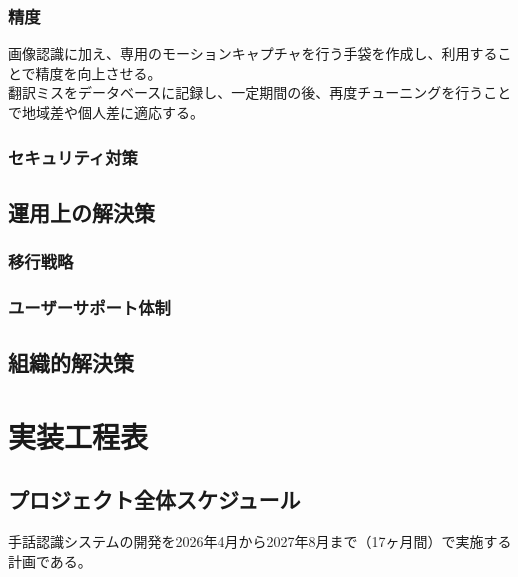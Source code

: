 \documentclass[12pt,a4paper]{jsarticle}
\begin{document}
\subsubsection{精度}
画像認識に加え、専用のモーションキャプチャを行う手袋を作成し、利用することで精度を向上させる。\\
翻訳ミスをデータベースに記録し、一定期間の後、再度チューニングを行うことで地域差や個人差に適応する。\\
\subsubsection{セキュリティ対策}

\subsection{運用上の解決策}

\subsubsection{移行戦略}

\subsubsection{ユーザーサポート体制}

\subsection{組織的解決策}

\section{実装工程表}

\subsection{プロジェクト全体スケジュール}
手話認識システムの開発を2026年4月から2027年8月まで（17ヶ月間）で実施する計画である。
\end{document}
